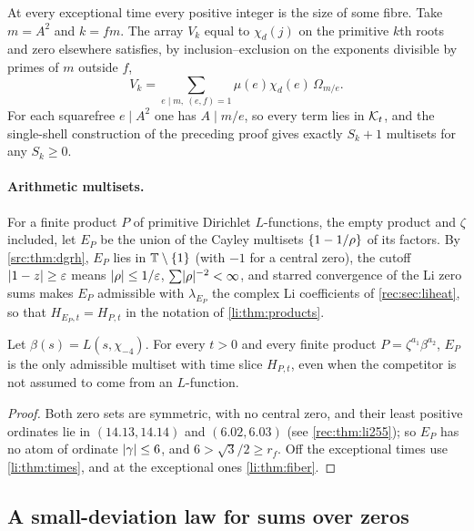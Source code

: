 \begin{remark}\label{li:rem:fibersizes}
At every exceptional time every positive integer is the size of some fibre. Take $m=A^2$ and $k=fm$. The array $V_k$
equal to $\chi_d(j)$ on the primitive $k$th roots and zero elsewhere satisfies, by inclusion--exclusion on the exponents
divisible by primes of $m$ outside $f$,
\[
 V_k=\sum_{e\mid m,\ (e,f)=1}\mu(e)\chi_d(e)\,\Omega_{m/e}.
\]
For each squarefree $e\mid A^2$ one has $A\mid m/e$, so every term lies in $\mathcal{K}_t$, and the single-shell construction of
the preceding proof gives exactly $S_k+1$ multisets for any $S_k\ge0$.
\end{remark}

\paragraph{Arithmetic multisets.}
For a finite product $P$ of primitive Dirichlet $L$-functions, the empty product and $\zeta$ included, let
$E_P$ be the union of the Cayley multisets $\{1-1/\rho\}$ of its factors. By \cref{src:thm:dgrh}, $E_P$ lies in
$\mathbb T\setminus\{1\}$ (with $-1$ for a central zero), the cutoff $\lvert1-z\rvert\ge\varepsilon$ means $\lvert\rho\rvert\le1/\varepsilon$, $\sum\lvert\rho\rvert^{-2}<\infty$, and
starred convergence of the Li zero sums \cite{Lagarias2007Li} makes $E_P$ admissible with $\lambda_{E_P}$ the complex Li
coefficients of \cref{rec:sec:liheat}, so that $H_{E_P,t}=H_{P,t}$ in the notation of \cref{li:thm:products}.

\begin{corollary}\label{li:cor:zetabetaslice}
Let $\beta(s)=L(s,\chi_{-4})$. For every $t>0$ and every finite product $P=\zeta^{a_1}\beta^{a_2}$, $E_P$ is the only admissible
multiset with time slice $H_{P,t}$, even when the competitor is not assumed to come from an $L$-function.
\end{corollary}

\begin{proof}
Both zero sets are symmetric, with no central zero, and their least positive ordinates lie in $(14.13,14.14)$
and $(6.02,6.03)$ (see \cref{rec:thm:li255}); so $E_P$ has no atom of ordinate $\lvert\gamma\rvert\le6$, and $6>\sqrt3/2\ge r_f$. Off the exceptional times use \cref{li:thm:times}, and at
the exceptional ones \cref{li:thm:fiber}.
\end{proof}

\subsection{A small-deviation law for sums over zeros}\label{ana:sec:smalldev}
{\raggedright{}}

